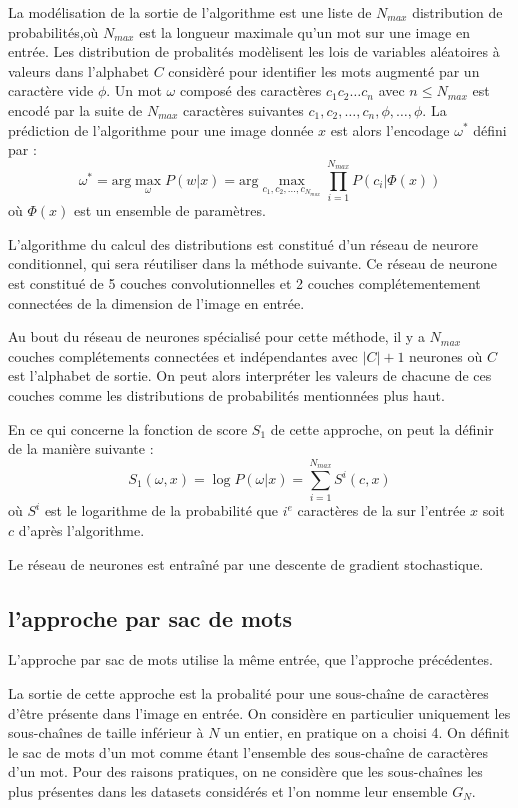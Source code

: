 \documentclass{article}
\begin{document}
La modélisation de la sortie de l'algorithme est une liste de $N_{max}$ distribution de probabilités,où $N_{max}$ est la longueur maximale qu'un mot sur une image en entrée. Les distribution de probalités modèlisent les lois de variables aléatoires à valeurs dans l'alphabet $C$ considèré pour identifier les mots augmenté par un caractère vide $\phi$. Un mot $\omega$ composé des caractères $c_1c_2\dots c_n$ avec $n\leq N_{max}$ est encodé par la suite de $N_{max}$ caractères suivantes $c_1, c_2, \dots,c_n,\phi,\dots,\phi$. La prédiction de l'algorithme pour une image donnée $x$ est alors l'encodage $\omega^*$ défini par :
$$ \omega^* = \text{arg} \max_{\omega} P(w|x) = \text{arg} \max_{c_1, c_2, \dots,c_{N_{max}}} \prod_{i=1}^{N_{max}} P(c_i|\Phi(x))$$
où $\Phi(x)$ est un ensemble de paramètres.

L'algorithme du calcul des distributions est constitué d'un réseau de neurore conditionnel, qui sera réutiliser dans la méthode suivante. Ce réseau de neurone est constitué de 5 couches convolutionnelles et 2 couches complétementement connectées de la dimension de l'image en entrée.

Au bout du réseau de neurones spécialisé pour cette méthode, il y a $N_{max}$ couches complétements connectées et indépendantes avec $|C|+1$ neurones où $C$ est l'alphabet de sortie. On peut alors interpréter les valeurs de chacune de ces couches comme les distributions de probabilités mentionnées plus haut.

En ce qui concerne la fonction de score $S_1$ de cette approche, on peut la définir de la manière suivante :
$$ S_1(\omega,x) = \log P(\omega|x)  = \sum_{i=1}^{N_{max}} S^i(c,x)$$
où $S^i$ est le logarithme de la probabilité que $i^e$ caractères de la sur l'entrée $x$ soit $c$ d'après l'algorithme.

Le réseau de neurones est entraîné par une descente de gradient stochastique.

\subsection{l'approche par sac de mots}

L'approche par sac de mots utilise la même entrée, que l'approche précédentes.

La sortie de cette approche est la probalité pour une sous-chaîne de caractères d'être présente dans l'image en entrée. On considère en particulier uniquement les sous-chaînes de taille inférieur à $N$ un entier, en pratique on a choisi 4. On définit le sac de mots d'un mot comme étant l'ensemble des sous-chaîne de caractères d'un mot. Pour des raisons pratiques, on ne considère que les sous-chaînes les plus présentes dans les datasets considérés et l'on nomme leur ensemble $G_N$.
\end{document}
